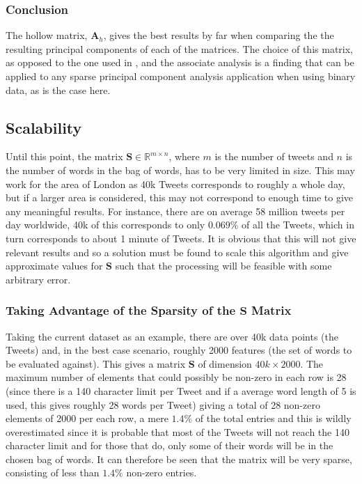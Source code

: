 \documentclass[11pt,a4paper]{article}
\newcommand{\covmat}{\mathbf{A}}
\begin{document}
\subsubsection*{Conclusion}
The hollow matrix, $\covmat_h$, gives the best results by far when comparing the the resulting principal components of each of the matrices. The choice of this matrix, as opposed to the one used in \cite{dimakis}, and the associate analysis is a finding that can be applied to any sparse principal component analysis application when using binary data, as is the case here.

\subsection{Scalability}
Until this point, the matrix $\mathbf{S} \in \mathbb{R}^{m \times n}$, where $m$ is the number of tweets and $n$ is the number of words in the bag of words, has to be very limited in size. This may work for the area of London as 40k Tweets corresponds to roughly a whole day, but if a larger area is considered, this may not correspond to enough time to give any meaningful results. For instance,  there are on average 58 million tweets per day worldwide,\cite{statbrain} 40k of this corresponds to only $0.069\%$ of all the Tweets, which in turn corresponds to about 1 minute of Tweets. It is obvious that this will not give relevant results and so a solution must be found to scale this algorithm and give approximate values for $\mathbf{S}$ such that the processing will be feasible with some arbitrary error. 

\subsubsection{Taking Advantage of the Sparsity of the $\mathbf{S}$ Matrix}
\label{sparsity_matrix}

Taking the current dataset as an example, there are over 40k data points (the Tweets) and, in the best case scenario, roughly 2000 features (the set of words to be evaluated against). This gives a matrix $\mathbf{S}$ of dimension $40k\times 2000$. 
The maximum number of elements that could possibly be non-zero in each row is 28 (since there is a 140 character limit per Tweet and if a average word length of 5 is used, this gives roughly 28 words per Tweet) giving a total of 28 non-zero elements of 2000 per each row, a mere $1.4\%$ of the total entries and this is wildly overestimated since it is probable that most of the Tweets will not reach the 140 character limit and for those that do, only some of their words will be in the chosen bag of words. It can therefore be seen that the matrix will be very sparse, consisting of less than $1.4\%$ non-zero entries.
\end{document}
